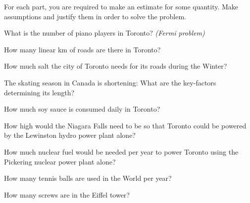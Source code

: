 \begin{exercises}
	For each part, you are required to make an estimate for some quantity. Make assumptions and justify them in order to solve the problem.
	
	\begin{problist}
		\prob What is the number of piano players in Toronto? \hfill \emph{(Fermi problem)}
		
		\prob How many linear km of roads are there in Toronto?
		
		\prob How much salt the city of Toronto needs for its roads during the Winter?
		
		\prob The skating season in Canada is shortening: What are the key-factors determining its length?
		
		\prob How much soy sauce is consumed daily in Toronto?
		
		\prob How high would the Niagara Falls need to be so that Toronto could be powered by the Lewinston hydro power plant alone?
		
		\prob How much nuclear fuel would be needed per year to power Toronto using the Pickering nuclear power plant alone?
		
		\prob How many tennis balls are used in the World per year?
		
		\prob How many screws are in the Eiffel tower?
	\end{problist}
\end{exercises}
